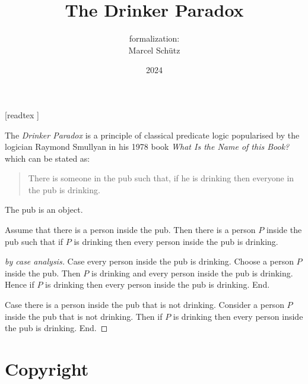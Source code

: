 \documentclass{article}
\title{The Drinker Paradox}
\author{\Naproche formalization: \vspace{0.5em} \\
Marcel Schütz}
\date{2024}
\begin{document}
  \maketitle

  \begin{imports}
    \begin{forthel}
      [readtex ]
    \end{forthel}
  \end{imports}

  \noindent The \emph{Drinker Paradox} is a principle of classical predicate 
  logic popularised by the logician Raymond Smullyan in his 1978 book
  \textit{What Is the Name of this Book?} \cite{Smullyan1978} which can be 
  stated as:

  \begin{quotation}
    \noindent There is someone in the pub such that, if he is drinking then 
    everyone in the pub is drinking.
  \end{quotation}

  \begin{forthel}
    \begin{signature*}
      The pub is an object.
    \end{signature*}
    
    \begin{theorem*}\label{drinker_paradox}
      Assume that there is a person inside the pub.
      Then there is a person $P$ inside the pub such that if $P$ is drinking then every person inside the pub is drinking.
    \end{theorem*}
    \begin{proof}[by case analysis]
      Case every person inside the pub is drinking.
        Choose a person $P$ inside the pub.
        Then $P$ is drinking and every person inside the pub is drinking.
        Hence if $P$ is drinking then every person inside the pub is drinking.
      End.
    
      Case there is a person inside the pub that is not drinking.
        Consider a person $P$ inside the pub that is not drinking.
        Then if $P$ is drinking then every person inside the pub is drinking.
      End.
    \end{proof}
  \end{forthel}

  \printbibliography

  \section*{Copyright}
  \doclicenseThis
\end{document}
